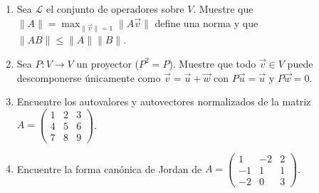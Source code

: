 \documentclass[12pt,a4paper]{article}
\begin{document}
\begin{enumerate}[1.]
\item Sea $\mathcal{L}$ el conjunto de operadores sobre $V$. Muestre que $\|A\|=\max_{\|\vec{v}\|=1}\|A\vec{v}\|$ define una norma y que $\|AB\|\leq\|A\|\|B\|$.

\item Sea $P:V\to V$ un proyector ($P^2=P$). Muestre que todo $\vec{v}\in V$ puede descomponerse únicamente como $\vec{v}=\vec{u}+\vec{w}$ con $P\vec{u}=\vec{u}$ y $P\vec{w}=0$.

\item Encuentre los autovalores y autovectores normalizados de la matriz $A=\begin{pmatrix}1 & 2 & 3 \\ 4 & 5 & 6 \\ 7 & 8 & 9\end{pmatrix}$.

\item Encuentre la forma canónica de Jordan de $A=\begin{pmatrix}1 & -2 & 2 \\ -1 & 1 & 1 \\ -2 & 0 & 3\end{pmatrix}$.
\end{enumerate}
\end{document}
